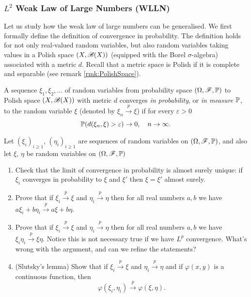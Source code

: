 \subsubsection{$L^2$ Weak Law of Large Numbers (WLLN)}
Let us study how the weak law of large numbers can be generalised. We first formally define the definition of convergence in probability. The definition holds for not only real-valued random variables, but also random variables taking values in a Polish space $(X,\mathcal{B}(X))$ (equipped with the Borel $\sigma$-algebra) associated with a metric $d$. Recall that a metric space is Polish if it is complete and separable (see remark \ref{rmk:PolishSpace}). 
\begin{definition}
A sequence $\xi_1, \xi_2, \dots $ of random variables from probability space $(\Omega,\mathcal{F},\mathbb{P})$ to Polish space $(X,\mathcal{B}(X))$ with metric $d$ converges \textit{in probability}, or \textit{in measure $\mathbb{P}$}, to the random variable $\xi$ (denoted by $\xi_n \xrightarrow{p} \xi$) if for every $\varepsilon > 0$
\begin{equation*}
    \mathbb{P}(d(\xi_n, \xi) > \varepsilon) \rightarrow 0, \quad n\rightarrow \infty.
\end{equation*}
\end{definition}

\begin{exercise} \label{ex:prop_of_conv_in_prob}
Let $(\xi_i)_{i\geq 1}$, $(\eta_i)_{i \geq 1}$ are sequences of random variables on $(\Omega,\mathcal{F},\mathbb{P})$, and also let $\xi$, $\eta$ be random variables on $(\Omega,\mathcal{F},\mathbb{P})$
\begin{enumerate}
    \item Check that the limit of convergence in probability is almost surely unique: if $\xi_i$ converges in probability to $\xi$ and $\xi'$ then $\xi = \xi'$ almost surely.
    \item Prove that if $\xi_i \overset{p}{\to} \xi$ and $\eta_i \overset{p}{\to} \eta$ then for all real numbers $a,b$ we have $a\xi_i + b\eta_i \overset{p}{\to} a\xi + b\eta$.
    \item Prove that if $\xi_i \overset{p}{\to} \xi$ and $\eta_i \overset{p}{\to} \eta$ then for all real numbers $a,b$ we have $\xi_i \eta_i \overset{p}{\to} \xi \eta$. Notice this is not necessary true if we have $L^p$ convergence. What's wrong with the argument, and can we refine the statements?
    \item (Slutsky's lemma) Show that if $\xi_i \xrightarrow{p} \xi$ and $\eta_i \xrightarrow{p} \eta$ and if $\varphi(x,y)$ is a continuous function, then 
    \begin{equation*}
        \varphi(\xi_i, \eta_i) \xrightarrow{p} \varphi(\xi, \eta).
    \end{equation*}
\end{enumerate}
\end{exercise}

